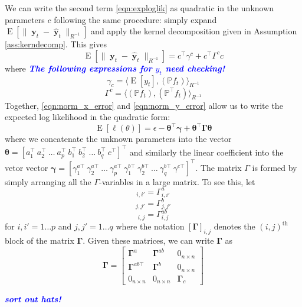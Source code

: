 \documentclass{IEEEtran}
\newcommand{\todo}[1]{\textsf{\emph{\textbf{\textcolor{blue}{#1}}}}}
\newcommand{\inner}[3]{\langle#1,#2\rangle_{#3}}
\newcommand{\dist}[2]{\|#1\|_{#2}}
\DeclareMathOperator{\E}{E}
\DeclareMathOperator{\yvec}{\mathbf{y}}
\begin{document}
We can write the second term \ref{eqn:exploglik} as quadratic in the unknown parameters $c$ following the same procedure: simply expand $\E[\dist{\yvec_t-\hat{\yvec}_t}{R^{-1}}]$ and apply the kernel decomposition given in Assumption \ref{ass:kerndecomp}. This gives
\begin{equation}
	\label{eqn:norm_y_error}
	\E[\dist{\yvec_t-\hat{\yvec}_t}{R^{-1}}] = c^\top \gamma^c + c^\top \Gamma^c c
\end{equation}
where \todo{The following expressions for $y_t$ need checking!}
\begin{equation}
	\gamma_c = \inner
	{\E[y_t]}
	{(\mathbb{P} f_t)}
	{R^{-1}}
\end{equation}
\begin{equation}
	 \Gamma^c = \inner
		{(\mathbb{P} f_t)}
		{(\mathbb{P}^\top f_t)}
		{R^{-1}}
\end{equation}
Together, \ref{eqn:norm_x_error} and \ref{eqn:norm_y_error} allow us to write the expected log likelihood in the quadratic form:
\begin{equation}
	\E[\ell(\theta)] = \epsilon - \boldsymbol{\theta}^\top \boldsymbol{\gamma} + \boldsymbol{\theta}^\top \boldsymbol{\Gamma} \boldsymbol{\theta}
\end{equation}
where we concatenate the unknown parameters into the vector $\boldsymbol{\theta} = [a_1^\top ~ a_2^\top ~ \ldots ~ a_p^\top ~ b_1^\top ~ b_2^\top ~ \ldots ~ b_q^\top ~ c^\top]^\top$ and similarly the linear coefficient into the vetor vector $\boldsymbol{\gamma} = [\gamma^{a\top}_1 ~ \gamma^{a\top}_2 ~ \ldots ~ \gamma^{a\top}_p ~ \gamma^{b\top}_1 ~ \gamma^{b\top}_2 ~ \ldots ~ \gamma^{b\top}_q ~ \gamma^{c\top}]^\top$. The matrix $\Gamma$ is formed by simply arranging all the $\Gamma$-variables in a large matrix. To see this, let 
\begin{equation}
	[\boldsymbol{\Gamma}^a]_{i,i'} = \Gamma_{i,i'}^a 
\end{equation}
\begin{equation}
	[\boldsymbol{\Gamma}^b]_{j,j'} = \Gamma_{j,j'}^b 
\end{equation}
\begin{equation}
	[\boldsymbol{\Gamma}^{ab}]_{i,j} = \Gamma_{i,j}^{ab}
\end{equation}
for $i,i' = 1 \ldots p$ and $j,j' = 1 \ldots q$ where the notation $[\boldsymbol{\Gamma}]_{i,j}$ denotes the $(i,j)^\mathrm{th}$ block of the matrix $\boldsymbol{\Gamma}$. Given these matrices, we can write $\boldsymbol{\Gamma}$ as 
\begin{equation}
	\boldsymbol{\Gamma} = \begin{bmatrix}
		\boldsymbol{\Gamma}^a & \boldsymbol{\Gamma}^{ab} & 0_{n\times n} \\
		\boldsymbol{\Gamma}^{ab\top} & \boldsymbol{\Gamma}^{b} & 0_{n\times n} \\
		0_{n\times n} & 0_{n\times n} & \boldsymbol{\Gamma}_c
	\end{bmatrix}
\end{equation}

\todo{sort out hats!}

\newpage
\end{document}
